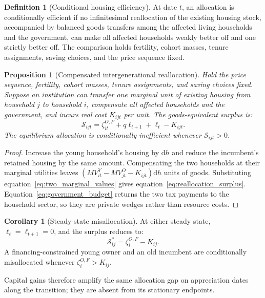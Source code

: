 \documentclass[10pt]{article}
\newtheorem{proposition}{Proposition}
\theoremstyle{definition}
\newtheorem{definition}{Definition}
\newtheorem{corollary}{Corollary}
\newcommand{\dd}{\mathrm d}
\begin{document}
\begin{definition}[Conditional housing efficiency]
At date $t$, an allocation is conditionally efficient if no infinitesimal
reallocation of the existing housing stock, accompanied by balanced goods
transfers among the affected living households and the government, can make
all affected households weakly better off and one strictly better off. The
comparison holds fertility, cohort masses, tenure assignments, saving choices,
and the price sequence fixed.
\end{definition}

\begin{proposition}[Compensated intergenerational reallocation]
Hold the price sequence, fertility, cohort masses, tenure assignments,
and saving choices fixed. Suppose an institution can transfer one marginal unit
of existing housing from household $j$ to household $i$, compensate all affected
households and the government, and incurs real cost $K_{ijt}$ per unit. The
goods-equivalent surplus is:
\begin{equation}
 \mathcal S_{ijt}
 =\zeta_{it}^{O,F}+q\ell_{t+1}+\ell_t-K_{ijt}.
 \label{eq:reallocation_surplus}
\end{equation}
The equilibrium allocation is conditionally inefficient whenever
$\mathcal S_{ijt}>0$.
\end{proposition}

\begin{proof}
Increase the young household's housing by $\dd h$ and reduce the incumbent's
retained housing by the same amount. Compensating the two households at their
marginal utilities leaves
$(MV_{it}^Y-MV_{jt}^O-K_{ijt})\dd h$ units of goods. Substituting
equation~\eqref{eq:two_marginal_values} gives
equation~\eqref{eq:reallocation_surplus}. Equation~\eqref{eq:government_budget}
returns the two tax payments to the household sector, so they are private
wedges rather than resource costs.
\end{proof}

\begin{corollary}[Steady-state misallocation]
At either steady state, $\ell_t=\ell_{t+1}=0$, and the surplus reduces to:
\begin{equation}
 \mathcal S_{ij}^*=\zeta_i^{O,F}-K_{ij}.
 \label{eq:ss_reallocation_surplus}
\end{equation}
A financing-constrained young owner and an old incumbent are conditionally
misallocated whenever $\zeta_i^{O,F}>K_{ij}$.
\end{corollary}
Capital gains therefore amplify the same allocation gap on appreciation dates
along the transition; they are absent from its stationary endpoints.
\end{document}
